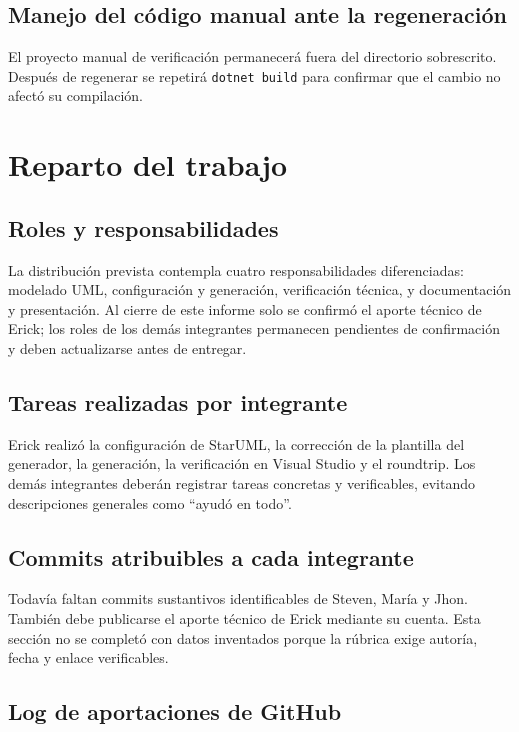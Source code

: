 \documentclass[12pt,a4paper]{article}
\begin{document}
\subsection{Manejo del código manual ante la regeneración}

El proyecto manual de verificación permanecerá fuera del directorio
sobrescrito. Después de regenerar se repetirá \texttt{dotnet build} para
confirmar que el cambio no afectó su compilación.


\section{Reparto del trabajo}

\subsection{Roles y responsabilidades}

La distribución prevista contempla cuatro responsabilidades diferenciadas:
modelado UML, configuración y generación, verificación técnica, y
documentación y presentación. Al cierre de este informe solo se confirmó el
aporte técnico de Erick; los roles de los demás integrantes permanecen
pendientes de confirmación y deben actualizarse antes de entregar.

\subsection{Tareas realizadas por integrante}

Erick realizó la configuración de StarUML, la corrección de la plantilla del
generador, la generación, la verificación en Visual Studio y el roundtrip. Los
demás integrantes deberán registrar tareas concretas y verificables, evitando
descripciones generales como ``ayudó en todo''.

\subsection{Commits atribuibles a cada integrante}

Todavía faltan commits sustantivos identificables de Steven, María y Jhon.
También debe publicarse el aporte técnico de Erick mediante su cuenta. Esta
sección no se completó con datos inventados porque la rúbrica exige autoría,
fecha y enlace verificables.

\subsection{Log de aportaciones de GitHub}
\end{document}
